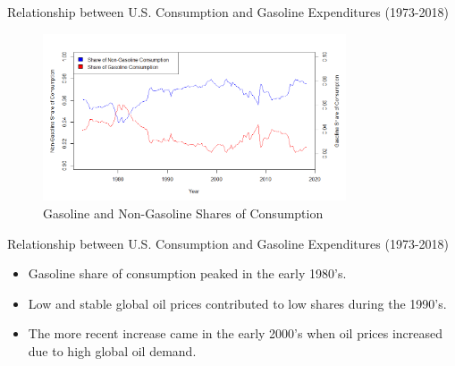 \documentclass[
  10pt,
  ignorenonframetext,
]{beamer}
\providecommand{\tightlist}{%
  \setlength{\itemsep}{0pt}\setlength{\parskip}{0pt}}
\begin{document}
\begin{frame}{Relationship between U.S. Consumption and Gasoline
Expenditures (1973-2018)}
\protect\hypertarget{relationship-between-u.s.-consumption-and-gasoline-expenditures-1973-2018}{}

\begin{figure}
\centering
\includegraphics[width=0.8\textwidth,height=\textheight]{Shares of Consumption.png}
\caption{Gasoline and Non-Gasoline Shares of Consumption}
\end{figure}

\end{frame}

\begin{frame}{Relationship between U.S. Consumption and Gasoline
Expenditures (1973-2018)}
\protect\hypertarget{relationship-between-u.s.-consumption-and-gasoline-expenditures-1973-2018-1}{}

\begin{itemize}
\tightlist
\item
  Gasoline share of consumption peaked in the early 1980's.
\item
  Low and stable global oil prices contributed to low shares during the
  1990's.
\item
  The more recent increase came in the early 2000's when oil prices
  increased due to high global oil demand.
\end{itemize}

\end{frame}
\end{document}
